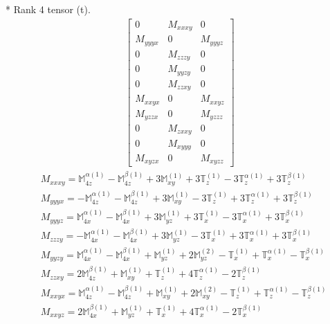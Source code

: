 \documentclass[fleqn,8pt,landscape]{jsarticle}
\begin{document}
* Rank 4 tensor (t).
\begin{align*}
\begin{bmatrix} 0 & M_{xxxy} & 0 \\ M_{yyyx} & 0 & M_{yyyz} \\ 0 & M_{zzzy} & 0 \\ 0 & M_{yyzy} & 0 \\ 0 & M_{zzxy} & 0 \\ M_{xxyx} & 0 & M_{xxyz} \\ M_{yzzx} & 0 & M_{yzzz} \\ 0 & M_{zxxy} & 0 \\ 0 & M_{xyyy} & 0 \\ M_{xyzx} & 0 & M_{xyzz} \end{bmatrix}
\end{align*}
\begin{align*}
& M_{xxxy} = \mathbb{M}_{4z}^{\alpha(1)} - \mathbb{M}_{4z}^{\beta(1)} + 3 \mathbb{M}_{xy}^{(1)} + 3 \mathbb{T}_{z}^{(1)} - 3 \mathbb{T}_{z}^{\alpha(1)} + 3 \mathbb{T}_{z}^{\beta(1)} \\
& M_{yyyx} = - \mathbb{M}_{4z}^{\alpha(1)} - \mathbb{M}_{4z}^{\beta(1)} + 3 \mathbb{M}_{xy}^{(1)} - 3 \mathbb{T}_{z}^{(1)} + 3 \mathbb{T}_{z}^{\alpha(1)} + 3 \mathbb{T}_{z}^{\beta(1)} \\
& M_{yyyz} = \mathbb{M}_{4x}^{\alpha(1)} - \mathbb{M}_{4x}^{\beta(1)} + 3 \mathbb{M}_{yz}^{(1)} + 3 \mathbb{T}_{x}^{(1)} - 3 \mathbb{T}_{x}^{\alpha(1)} + 3 \mathbb{T}_{x}^{\beta(1)} \\
& M_{zzzy} = - \mathbb{M}_{4x}^{\alpha(1)} - \mathbb{M}_{4x}^{\beta(1)} + 3 \mathbb{M}_{yz}^{(1)} - 3 \mathbb{T}_{x}^{(1)} + 3 \mathbb{T}_{x}^{\alpha(1)} + 3 \mathbb{T}_{x}^{\beta(1)} \\
& M_{yyzy} = \mathbb{M}_{4x}^{\alpha(1)} - \mathbb{M}_{4x}^{\beta(1)} + \mathbb{M}_{yz}^{(1)} + 2 \mathbb{M}_{yz}^{(2)} - \mathbb{T}_{x}^{(1)} + \mathbb{T}_{x}^{\alpha(1)} - \mathbb{T}_{x}^{\beta(1)} \\
& M_{zzxy} = 2 \mathbb{M}_{4z}^{\beta(1)} + \mathbb{M}_{xy}^{(1)} + \mathbb{T}_{z}^{(1)} + 4 \mathbb{T}_{z}^{\alpha(1)} - 2 \mathbb{T}_{z}^{\beta(1)} \\
& M_{xxyx} = \mathbb{M}_{4z}^{\alpha(1)} - \mathbb{M}_{4z}^{\beta(1)} + \mathbb{M}_{xy}^{(1)} + 2 \mathbb{M}_{xy}^{(2)} - \mathbb{T}_{z}^{(1)} + \mathbb{T}_{z}^{\alpha(1)} - \mathbb{T}_{z}^{\beta(1)} \\
& M_{xxyz} = 2 \mathbb{M}_{4x}^{\beta(1)} + \mathbb{M}_{yz}^{(1)} + \mathbb{T}_{x}^{(1)} + 4 \mathbb{T}_{x}^{\alpha(1)} - 2 \mathbb{T}_{x}^{\beta(1)} \\

\end{align*}
\end{document}
